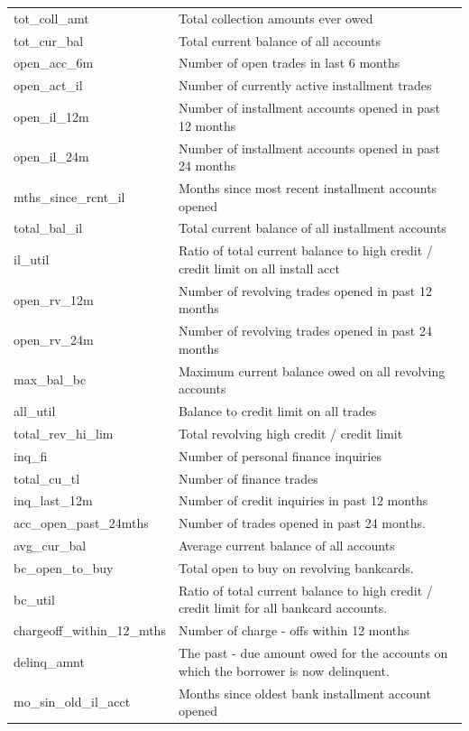 \documentclass[11pt,]{report}
\begin{document}
\begin{longtable}[t]{>{\raggedright\arraybackslash}p{7cm}>{\raggedright\arraybackslash}p{7cm}}
tot\_coll\_amt & Total collection amounts ever owed\\
tot\_cur\_bal & Total current balance of all accounts\\
open\_acc\_6m & Number of open trades in last 6 months\\
open\_act\_il & Number of currently active installment trades\\
open\_il\_12m & Number of installment accounts opened in past 12 months\\
\addlinespace
open\_il\_24m & Number of installment accounts opened in past 24 months\\
mths\_since\_rcnt\_il & Months since most recent installment accounts opened\\
total\_bal\_il & Total current balance of all installment accounts\\
il\_util & Ratio of total current balance to high credit /
    credit limit on all install acct\\
open\_rv\_12m & Number of revolving trades opened in past 12 months\\
\addlinespace
open\_rv\_24m & Number of revolving trades opened in past 24 months\\
max\_bal\_bc & Maximum current balance owed on all revolving accounts\\
all\_util & Balance to credit limit on all trades\\
total\_rev\_hi\_lim & Total revolving high credit /
    credit limit\\
inq\_fi & Number of personal finance inquiries\\
\addlinespace
total\_cu\_tl & Number of finance trades\\
inq\_last\_12m & Number of credit inquiries in past 12 months\\
acc\_open\_past\_24mths & Number of trades opened in past 24 months.\\
avg\_cur\_bal & Average current balance of all accounts\\
bc\_open\_to\_buy & Total open to buy on revolving bankcards.\\
\addlinespace
bc\_util & Ratio of total current balance to high credit /
    credit limit for all bankcard accounts.\\
chargeoff\_within\_12\_mths & Number of charge -
    offs within 12 months\\
delinq\_amnt & The past - due amount owed for the accounts on which the borrower is now delinquent.\\
mo\_sin\_old\_il\_acct & Months since oldest bank installment account opened\\

\end{longtable}
\end{document}
